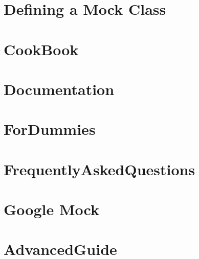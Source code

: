 \documentclass[twoside]{book}
\newcommand{\+}{\discretionary{\mbox{\scriptsize$\hookleftarrow$}}{}{}}
\begin{document}
\chapter{Defining a Mock Class}
\label{md_vendor_googletest_googlemock_docs_v1_7_CheatSheet}

\chapter{Cook\+Book}
\label{md_vendor_googletest_googlemock_docs_v1_7_CookBook}

\chapter{Documentation}
\label{md_vendor_googletest_googlemock_docs_v1_7_Documentation}

\chapter{For\+Dummies}
\label{md_vendor_googletest_googlemock_docs_v1_7_ForDummies}

\chapter{Frequently\+Asked\+Questions}
\label{md_vendor_googletest_googlemock_docs_v1_7_FrequentlyAskedQuestions}

\chapter{Google Mock}
\label{md_vendor_googletest_googlemock_README}

\chapter{Advanced\+Guide}
\label{md_vendor_googletest_googletest_docs_AdvancedGuide}

\end{document}
